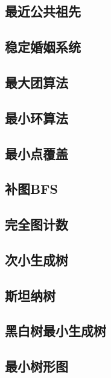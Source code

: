 \documentclass{article}
\begin{document}
\subsection{最近公共祖先} 

\subsection{稳定婚姻系统} 


\subsection{最大团算法} 

\subsection{最小环算法} 

\subsection{最小点覆盖} 

\subsection{补图BFS} 

\subsection{完全图计数} 


\subsection{次小生成树} 

\subsection{斯坦纳树} 

\subsection{黑白树最小生成树} 

\subsection{最小树形图} 

\end{document}
